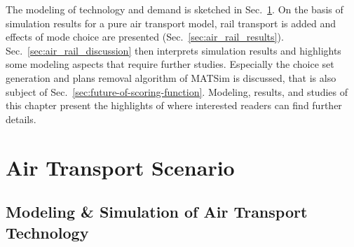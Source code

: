 The modeling of technology and demand is sketched in Sec.~\ref{sec:air_rail_scenario}. 
On the basis of simulation results for a pure air transport model, rail transport is added and effects of mode choice are presented (Sec.~\ref{sec:air_rail_results}). 
Sec.~\ref{sec:air_rail_discussion} then interprets simulation results and highlights some modeling aspects that require further studies. 
Especially the choice set generation and plans removal algorithm of MATSim is discussed, that is also subject of Sec.~\ref{sec:future-of-scoring-function}. 
Modeling, results, and studies of this chapter present the highlights of \citet[][Chapter~6, pp.~119]{Grether2014PhD} where interested readers can find further details.   


\section{Air Transport Scenario}
\label{sec:air_rail_scenario}

\subsection{Modeling \& Simulation of Air Transport Technology}
\label{sec:modeling-of-technology}

